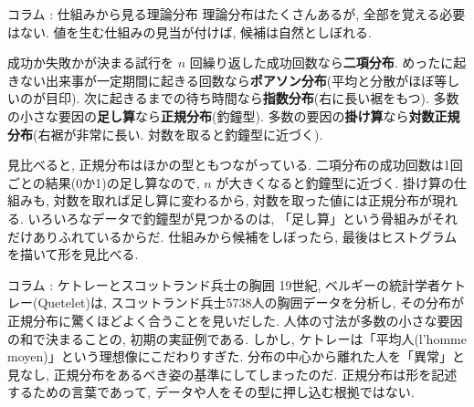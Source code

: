   \begin{mybox}{コラム : 仕組みから見る理論分布}
    理論分布はたくさんあるが, 全部を覚える必要はない.
    値を生む仕組みの見当が付けば, 候補は自然としぼれる.

    成功か失敗かが決まる試行を $n$ 回繰り返した成功回数なら\textbf{二項分布}.
    めったに起きない出来事が一定期間に起きる回数なら\textbf{ポアソン分布}(平均と分散がほぼ等しいのが目印).
    次に起きるまでの待ち時間なら\textbf{指数分布}(右に長い裾をもつ).
    多数の小さな要因の\textbf{足し算}なら\textbf{正規分布}(釣鐘型).
    多数の要因の\textbf{掛け算}なら\textbf{対数正規分布}(右裾が非常に長い. 対数を取ると釣鐘型に近づく).

    見比べると, 正規分布はほかの型ともつながっている.
    二項分布の成功回数は1回ごとの結果(0か1)の足し算なので, $n$ が大きくなると釣鐘型に近づく.
    掛け算の仕組みも, 対数を取れば足し算に変わるから, 対数を取った値には正規分布が現れる.
    いろいろなデータで釣鐘型が見つかるのは, 「足し算」という骨組みがそれだけありふれているからだ.
    仕組みから候補をしぼったら, 最後はヒストグラムを描いて形を見比べる.
  \end{mybox}

  \begin{mybox}{コラム : ケトレーとスコットランド兵士の胸囲}
    19世紀, ベルギーの統計学者ケトレー(Quetelet)は, スコットランド兵士5738人の胸囲データを分析し, その分布が正規分布に驚くほどよく合うことを見いだした.\footnotemark
    人体の寸法が多数の小さな要因の和で決まることの, 初期の実証例である.
    しかし, ケトレーは「平均人(l'homme moyen)」という理想像にこだわりすぎた.
    分布の中心から離れた人を「異常」と見なし, 正規分布をあるべき姿の基準にしてしまったのだ.
    正規分布は形を記述するための言葉であって, データや人をその型に押し込む根拠ではない.
  \end{mybox}
